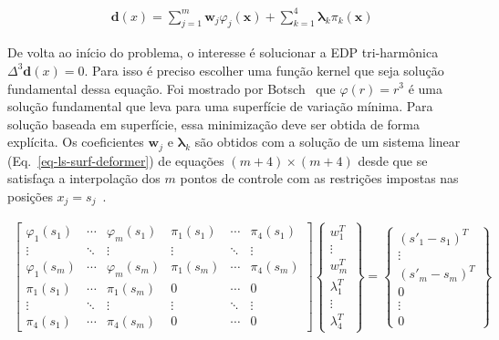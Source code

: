 \begin{align}
  &\boldsymbol{d}(x)=\sum_{j=1}^m \boldsymbol{w}_j\varphi_j(\boldsymbol{x})+\sum_{k=1}^4 \boldsymbol{\lambda}_k\pi_k(\boldsymbol{x})\label{eq-surf-rbf}
\end{align}

De volta ao início do problema, o interesse é solucionar a EDP tri-harmônica $\Delta^3\boldsymbol{d}(x)=0$. Para isso é preciso escolher uma função kernel que seja solução fundamental dessa equação. Foi mostrado por Botsch~\cite{Botsch} que $\varphi(r)=r^3$ é uma solução fundamental que leva para uma superfície de variação mínima. Para solução baseada em superfície, essa minimização deve ser obtida de forma explícita. Os coeficientes $\boldsymbol{w}_j$ e $\boldsymbol{\lambda}_k$ são obtidos com a solução de um sistema linear (Eq.~\ref{eq-ls-surf-deformer}) de equações $(m+4)\times(m+4)$ desde que se satisfaça a interpolação dos $m$ pontos de controle com as restrições impostas nas posições $x_j=s_j$~\cite{Muller}.

\begin{align}
  \begin{bmatrix}
    \varphi_1(s_1) & \cdots & \varphi_m(s_1) & \pi_1(s_1) & \cdots & \pi_4(s_1)\\ 
    \vdots & \ddots & \vdots & \vdots & \ddots & \vdots\\
    \varphi_1(s_m) & \cdots & \varphi_m(s_m) & \pi_1(s_m) & \cdots & \pi_4(s_m)\\ 
    \pi_1(s_1) & \cdots & \pi_1(s_m) & 0 & \cdots & 0\\
    \vdots & \ddots & \vdots & \vdots & \ddots & \vdots\\
    \pi_4(s_1) & \cdots & \pi_4(s_m) & 0 & \cdots & 0
  \end{bmatrix}
  \begin{Bmatrix}
    w_1^T\\
    \vdots\\
    w_m^T\\
    \lambda_1^T\\
    \vdots\\
    \lambda_4^T
  \end{Bmatrix}=
  \begin{Bmatrix}
    (s'_1-s_1)^T\\
    \vdots\\
    (s'_m-s_m)^T\\
    0\\
    \vdots\\
    0
  \end{Bmatrix}\label{eq-ls-surf-deformer}
\end{align}

